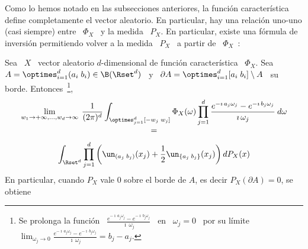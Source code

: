{Como   lo  hemos   notado   en  las   subsecciones   anteriores,  la   funci\'on
caracter\'istica define  completamente el  vector aleatorio. En  particular, hay
una relaci\'on uno-uno (casi siempre) entre \ $\Phi_X$ \ y la medida \ $P_X$. En
particular, existe una f\'ormula de inversi\'on permitiendo volver a la medida \
$P_X$ \ a partir de \ $\Phi_X$~\cite{AshDol99, Sas13}:
%
\begin{teorema}\label{Teo:MP:InversionFourierStieltjes}
%
  Sea \ $X$  \ vector aleatorio $d$-dimensional de  funci\'on caracter\'istica \
  $\Phi_X$.   Sea  \  $\displaystyle  A  = \optimes_{i=1}^d  (a_i  \;  b_i)  \in
  \B(\Rset^d)$ \ y \ $\partial A  = \optimes_{i=1}^d [a_i \; b_i] \setminus A$ \
  su borde. Entonces~\footnote{Se prolonga  la funci\'on \ $\frac{e^{- \imath \,
        a_j \omega_j} - e^{- \imath  \, b_j \omega_j}}{\imath \, \omega_j}$ \ en
    \ $\omega_j  = 0$ \ por  su l\'imite \ $\displaystyle  \lim_{\omega_j \to 0}
    \frac{e^{- \imath \, a_j \omega_j} - e^{- \imath \, b_j \omega_j}}{\imath \,
      \omega_j} = b_j - a_j$.},
  \[
  \begin{array}{c}
  \displaystyle \lim_{w_1 \to +\infty,\ldots, w_d \to \infty} \: \frac{1}{(2
  \pi)^d} \int_{\optimes_{j=1}^d [-w_j \; w_j]} \Phi_X(\omega) \prod_{j = 1}^d
  \frac{e^{- \imath \, a_j \omega_j} - e^{- \imath \, b_j \omega_j}}{\imath \,
  \omega_j} \: d\omega\\[2.5mm]
  =\\[2.5mm]
   \displaystyle \int_{\Rset^d} \prod_{j=1}^d \left(
     \un_{\left(  a_j \;  b_j \right)}(x_j)  +  \frac12 \un_{\left\{  a_j \;  b_j
       \right\}}(x_j) \right) dP_X(x)
  \end{array}
  \]
  En particular, cuando $P_X$ vale 0  sobre el borde de $A$, es decir $P_X\left(
  \partial A \right) = 0$, se obtiene


\end{teorema}}
